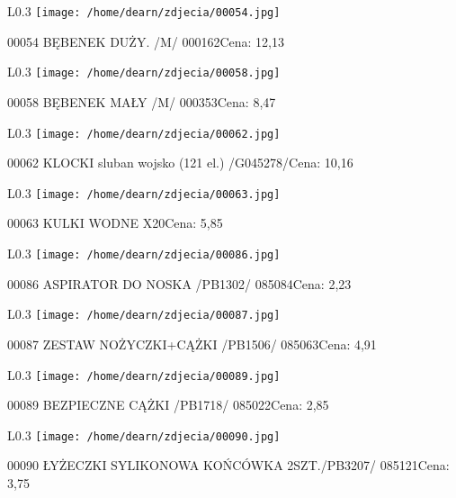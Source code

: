 \begin{wrapfigure}{L}{0.3\textwidth}
\texttt{[image: /home/dearn/zdjecia/00054.jpg]}
\end{wrapfigure}
00054 BĘBENEK DUŻY. /M/                               000162Cena: 12,13\newline
\begin{wrapfigure}{L}{0.3\textwidth}
\texttt{[image: /home/dearn/zdjecia/00058.jpg]}
\end{wrapfigure}
00058 BĘBENEK MAŁY /M/                                000353Cena: 8,47\newline
\begin{wrapfigure}{L}{0.3\textwidth}
\texttt{[image: /home/dearn/zdjecia/00062.jpg]}
\end{wrapfigure}
00062 KLOCKI sluban wojsko (121 el.) /G045278/Cena: 10,16\newline
\begin{wrapfigure}{L}{0.3\textwidth}
\texttt{[image: /home/dearn/zdjecia/00063.jpg]}
\end{wrapfigure}
00063 KULKI WODNE  X20Cena: 5,85\newline
\begin{wrapfigure}{L}{0.3\textwidth}
\texttt{[image: /home/dearn/zdjecia/00086.jpg]}
\end{wrapfigure}
00086 ASPIRATOR DO NOSKA  /PB1302/                    085084Cena: 2,23\newline
\begin{wrapfigure}{L}{0.3\textwidth}
\texttt{[image: /home/dearn/zdjecia/00087.jpg]}
\end{wrapfigure}
00087 ZESTAW NOŻYCZKI+CĄŻKI  /PB1506/                 085063Cena: 4,91\newline
\begin{wrapfigure}{L}{0.3\textwidth}
\texttt{[image: /home/dearn/zdjecia/00089.jpg]}
\end{wrapfigure}
00089 BEZPIECZNE CĄŻKI  /PB1718/                      085022Cena: 2,85\newline
\begin{wrapfigure}{L}{0.3\textwidth}
\texttt{[image: /home/dearn/zdjecia/00090.jpg]}
\end{wrapfigure}
00090 ŁYŻECZKI SYLIKONOWA KOŃCÓWKA 2SZT./PB3207/      085121Cena: 3,75\newline
